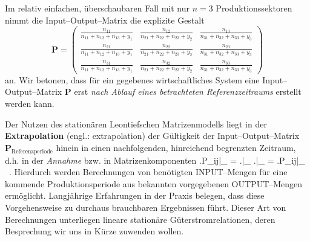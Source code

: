 \medskip
\noindent
Im relativ einfachen, \"uberschaubaren Fall mit nur $n=3$
Produktionssektoren nimmt die Input--Output--Matrix die
explizite Gestalt
%
\[
\displaystyle
\mathbf{P} =
\left(\begin{array}{ccc}
\frac{n_{11}}{n_{11}+n_{12}+n_{13}+y_{1}} &
\frac{n_{12}}{n_{21}+n_{22}+n_{23}+y_{2}} &
\frac{n_{13}}{n_{31}+n_{32}+n_{33}+y_{3}} \\
\frac{n_{21}}{n_{11}+n_{12}+n_{13}+y_{1}} &
\frac{n_{22}}{n_{21}+n_{22}+n_{23}+y_{2}} &
\frac{n_{23}}{n_{31}+n_{32}+n_{33}+y_{3}} \\
\frac{n_{31}}{n_{11}+n_{12}+n_{13}+y_{1}} &
\frac{n_{32}}{n_{21}+n_{22}+n_{23}+y_{2}} &
\frac{n_{33}}{n_{31}+n_{32}+n_{33}+y_{3}}
\end{array}\right)
\]
%
an. Wir betonen, dass f\"ur ein gegebenes wirtschaftliches System
eine Input--Output--Matrix $\mathbf{P}$ erst {\em nach Ablauf
eines betrachteten Referenzzeitraums\/} erstellt werden kann.

\medskip
\noindent
Der Nutzen des station\"{a}ren Leontiefschen Matrizenmodells liegt 
in der {\bf Extrapolation} (engl.: extrapolation) der G\"ultigkeit 
der Input--Output--Matrix $\mathbf{P}_{\text{Referenzperiode}}$ 
hinein in einen nachfolgenden, hinreichend begrenzten Zeitraum, 
d.h. in der {\em Annahme\/}
%
\be
{}
\ee
%
bzw. in Matrizenkomponenten
%
\be
\left.P_{ij}\right|_{}
= \left.\right|_{}
\approx
\left.\right|_{}
= \left.P_{ij}\right|_{}
\ .
\ee
%
Hierdurch werden Berechnungen von ben\"otigten
INPUT--Mengen f\"ur eine kommende Produktionsperiode aus bekannten
vorgegebenen OUTPUT--Mengen erm\"oglicht. Langj\"ahrige
Erfahrungen in der Praxis belegen, dass diese Vorgehensweise zu
durchaus brauchbaren Ergebnissen f\"uhrt. Dieser Art von
Berechnungen unterliegen lineare station\"{a}re 
G\"uterstromrelationen, deren Besprechung wir uns in K\"urze 
zuwenden wollen.

